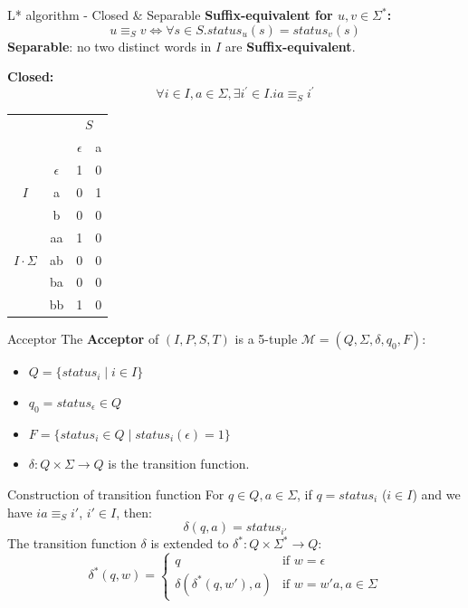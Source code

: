 \documentclass{beamer}
\begin{document}
\begin{frame}{L* algorithm - Closed \&  Separable}
    \textbf{Suffix-equivalent for $u, v \in \Sigma^{*}$: }
    $$
        u \equiv_{S} v \Leftrightarrow  \forall s \in S .status_u(s) = status_{v}(s)
    $$
    \textbf{\small Separable}: \small no two distinct words in $I$ are \textbf{Suffix-equivalent}. 

    \textbf{Closed: }
    $$
        \forall i \in I , a \in \Sigma, \exists i^{\prime} \in I.ia \equiv_{S} i^{\prime}
    $$
    \centering
    \begin{tabular}{cc|c|c}
        &   & \multicolumn{2}{c}{$S$} \\ 
        \multicolumn{2}{c|}{} & $\epsilon$ & a \\ \hline
        & $\epsilon$ & 1 & 0 \\
        {$I$}& a          & 0 & 1 \\
        & b          & 0 & 0 \\ \hline
        
        & aa& 1& 0 \\
        {$I \cdot \Sigma$}& ab& 0&0\\
        & ba         & 0 & 0 \\
        & bb         & 1 & 0 \\  
    \end{tabular}
\end{frame}

\begin{frame}{Acceptor}
    The \textbf{Acceptor} of $(I,P,S,T)$ is a 5-tuple $\mathcal{M} = (Q,\Sigma,\delta,q_0,F)$:
    \begin{itemize}
        \item $Q = \{status_i \mid i \in I\}$
        \item $q_0 = status_{\epsilon} \in Q$
        \item $F = \{status_i \in Q \mid status_i(\epsilon) = 1\}$
        \item $\delta \colon Q \times \Sigma \to Q$ is the transition function.
    \end{itemize}
    \begin{block}{Construction of transition function}
        For $q \in Q, a \in \Sigma$, if $q = status_i$ ($i \in I$) and we have $ia \equiv_{S} i'$, $i' \in I$, then:
        \[
            \delta(q,a) = status_{i'}
        \]
        The transition function $\delta$ is extended to $\delta^{*} \colon Q \times \Sigma^{*} \to Q$:
        \[
            \delta^{*}(q,w) = 
            \begin{cases}
                q & \text{if } w = \epsilon \\
                \delta(\delta^*(q,w'),a) & \text{if } w = w'a, a \in \Sigma
            \end{cases}
        \]
    \end{block}
\end{frame}
\end{document}
